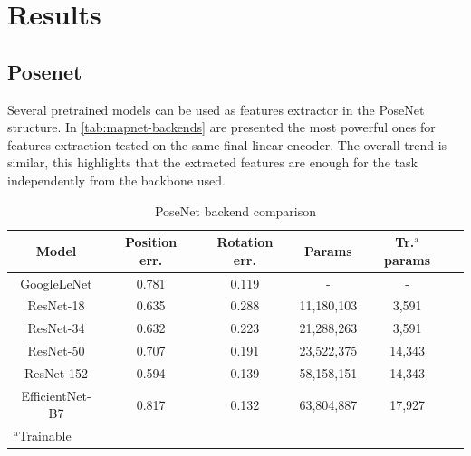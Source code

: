 \section{Results}
\subsection{Posenet}
Several pretrained models can be used as features extractor in the PoseNet structure. In \cref{tab:mapnet-backends} are presented the most powerful ones for features extraction tested on the same final linear encoder. The overall trend is similar, this highlights that the extracted features are enough for the task independently from the backbone used.
\begin{table}[htbp]
\caption{PoseNet backend comparison}
\begin{center}
\begin{tabular}{|c|c|c|c|c|c|}
\hline
\textbf{Model}&\textbf{Position err.}&\textbf{Rotation err.}&\textbf{Params}&\textbf{Tr.$^{\mathrm{a}}$ params} \\
\hline
GoogleLeNet     &0.781&0.119&-         &-      \\
ResNet-18       &0.635&0.288&11,180,103&3,591  \\
ResNet-34       &0.632&0.223&21,288,263&3,591  \\
ResNet-50       &0.707&0.191&23,522,375&14,343 \\
ResNet-152      &0.594&0.139&58,158,151&14,343 \\
EfficientNet-B7 &0.817&0.132&63,804,887&17,927 \\
\hline
\multicolumn{4}{l}{$^{\mathrm{a}}$Trainable}
\end{tabular}
\label{tab:posenet-backends}
\end{center}
\end{table}
